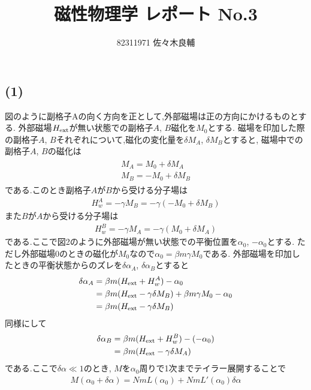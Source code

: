 \documentclass[uplatex,a4j,11pt,dvipdfmx]{jsarticle}
\begin{document}
\title{磁性物理学 レポート No.3}
\author{82311971 佐々木良輔}
\date{}
\maketitle
\subsection*{(1)}
図のように副格子Aの向く方向を正として,外部磁場は正の方向にかけるものとする.
外部磁場$H_{\rm ext}$が無い状態での副格子$A$, $B$磁化を$M_0$とする.
磁場を印加した際の副格子$A$, $B$それぞれについて,磁化の変化量を$\delta M_A$, $\delta M_B$とすると,
磁場中での副格子$A$, $B$の磁化は
\begin{align}
  \begin{split}
    M_A=M_0+\delta M_A\\
    M_B=-M_0+\delta M_B
  \end{split}
\end{align}
である.このとき副格子$A$が$B$から受ける分子場は
\begin{align}
  H_w^A=-\gamma M_B=-\gamma(-M_0+\delta M_B)
\end{align}
また$B$が$A$から受ける分子場は
\begin{align}
  H_w^B=-\gamma M_A=-\gamma(M_0+\delta M_A)
\end{align}
である.ここで図2のように外部磁場が無い状態での平衡位置を$\alpha_0$, $-\alpha_0$とする.
ただし外部磁場0のときの磁化が$M_0$なので$\alpha_0=\beta m\gamma M_0$である.
外部磁場を印加したときの平衡状態からのズレを$\delta\alpha_A$, $\delta\alpha_B$とすると
\begin{align}
  \begin{split}
    \delta\alpha_A&=\beta m(H_{\rm ext}+H_w^A)-\alpha_0\\
    &=\beta m(H_{\rm ext}-\gamma\delta M_B)+\beta m\gamma M_0-\alpha_0\\
    &=\beta m(H_{\rm ext}-\gamma\delta M_B)
  \end{split}
\end{align}
同様にして
\begin{align}
  \begin{split}
    \delta\alpha_B&=\beta m(H_{\rm ext}+H_w^B)-(-\alpha_0)\\
    &=\beta m(H_{\rm ext}-\gamma\delta M_A)
  \end{split}
\end{align}
である.ここで$\delta\alpha\ll1$のとき,
$M$を$\alpha_0$周りで1次までテイラー展開することで
\begin{align}
  M(\alpha_0+\delta\alpha)=NmL(\alpha_0)+NmL'(\alpha_0)\delta\alpha
\end{align}
\end{document}
